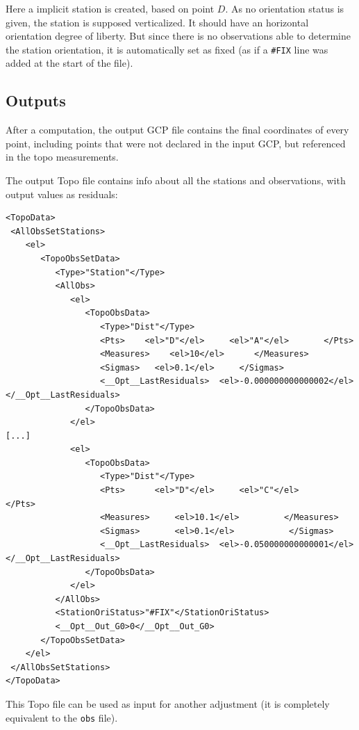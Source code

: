 Here a implicit station is created, based on point $D$.
As no orientation status is given, the station is supposed verticalized.
It should have an horizontal orientation degree of liberty.
But since there is no observations able to determine the station orientation,
it is automatically set as fixed (as if a {\tt \#FIX} line was added at the start of the file).

\subsection{Outputs}

After a computation, the output GCP file contains the final coordinates of every point, including
points that were not declared in the input GCP, but referenced in the topo measurements.

The output Topo file contains info about all the stations and observations,
with output values as residuals:

\begin{lstlisting}
<TopoData>
 <AllObsSetStations>
    <el>
       <TopoObsSetData>
          <Type>"Station"</Type>
          <AllObs>
             <el>
                <TopoObsData>
                   <Type>"Dist"</Type>
                   <Pts>    <el>"D"</el>     <el>"A"</el>       </Pts>
                   <Measures>    <el>10</el>      </Measures>
                   <Sigmas>   <el>0.1</el>     </Sigmas>
                   <__Opt__LastResiduals>  <el>-0.000000000000002</el>  </__Opt__LastResiduals>
                </TopoObsData>
             </el>
[...]
             <el>
                <TopoObsData>
                   <Type>"Dist"</Type>
                   <Pts>      <el>"D"</el>     <el>"C"</el>          </Pts>
                   <Measures>     <el>10.1</el>         </Measures>
                   <Sigmas>       <el>0.1</el>           </Sigmas>
                   <__Opt__LastResiduals>  <el>-0.050000000000001</el>  </__Opt__LastResiduals>
                </TopoObsData>
             </el>
          </AllObs>
          <StationOriStatus>"#FIX"</StationOriStatus>
          <__Opt__Out_G0>0</__Opt__Out_G0>
       </TopoObsSetData>
    </el>
 </AllObsSetStations>
</TopoData>
\end{lstlisting}

This Topo file can be used as input for another adjustment (it is completely equivalent to the {\tt obs} file).
